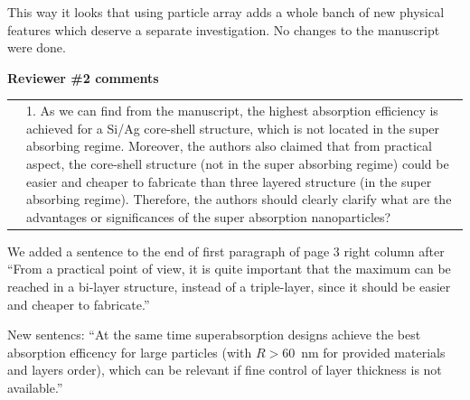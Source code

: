 \documentclass[a4paper]{article}
\begin{document}
This way it looks that using particle array adds a whole banch of new
physical features which deserve a separate investigation. No changes
to the manuscript were done.





\vspace{10pt}

\newpage
\begin{minipage}{1.0\linewidth}
  \textbf{Reviewer \#2 comments}\\
  \begin{tabular}[!H]{l|p{}}
    \quad & 1.  As we can find from the manuscript, the highest
    absorption efficiency is achieved for a Si/Ag core-shell
    structure, which is not located in the super absorbing
    regime. Moreover, the authors also claimed that from practical
    aspect, the core-shell structure (not in the super absorbing
    regime) could be easier and cheaper to fabricate than three
    layered structure (in the super absorbing regime). Therefore, the
    authors should clearly clarify what are the advantages or
    significances of the super absorption nanoparticles? 
\end{tabular}
\end{minipage}

We added a sentence to the end of first paragraph of page 3 right
column after ``From a practical point of view, it is
quite important that the maximum can be reached in a bi-layer
structure, instead of a triple-layer, since it should be easier and
cheaper to fabricate.''

New sentencs: ``At the same time superabsorption designs achieve the
best absorption efficency for large particles (with
$R>60$~nm for provided materials and layers order), which can be
relevant if fine control of layer thickness is not available.''


\end{document}
